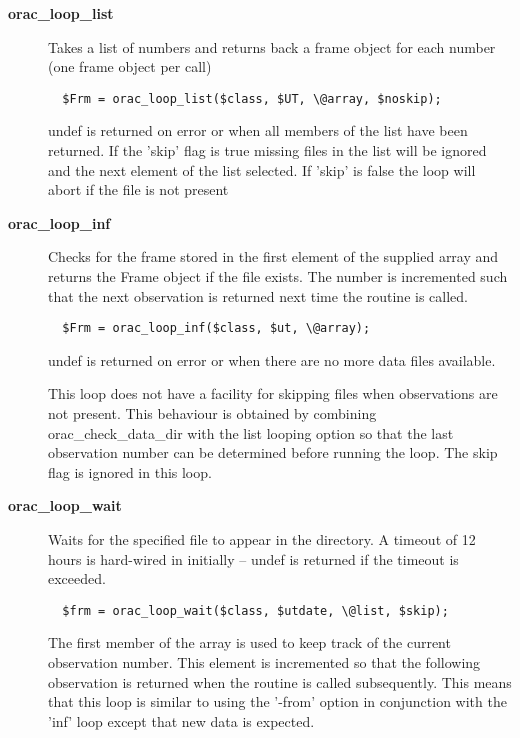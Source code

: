 \begin{description}

\item[{\textbf{orac\_loop\_list}}] \mbox{}

Takes a list of numbers and returns back a frame object
for each number (one frame object per call)

\begin{verbatim}
  $Frm = orac_loop_list($class, $UT, \@array, $noskip);
\end{verbatim}


undef is returned on error or when all members of the
list have been returned. If the 'skip' flag is true
missing files in the list will be ignored and the next
element of the list selected. If 'skip' is false
the loop will abort if the file is not present


\item[{\textbf{orac\_loop\_inf}}] \mbox{}

Checks for the frame stored in the first element of the supplied array
and returns the Frame object if the file exists. The number is incremented
such that the next observation is returned next time the routine is
called.

\begin{verbatim}
  $Frm = orac_loop_inf($class, $ut, \@array);
\end{verbatim}


undef is returned on error or when there are no more data files
available.



This loop does not have a facility for skipping files when observations
are not present. This behaviour is obtained by combining
orac\_check\_data\_dir with the list looping option so that the last
observation number can be determined before running the loop. The skip
flag is ignored in this loop.


\item[{\textbf{orac\_loop\_wait}}] \mbox{}

Waits for the specified file to appear in the directory.
A timeout of 12 hours is hard-wired in initially -- undef
is returned if the timeout is exceeded.

\begin{verbatim}
  $frm = orac_loop_wait($class, $utdate, \@list, $skip);
\end{verbatim}


The first member of the array is used to keep track of the
current observation number. This element is incremented so that
the following observation is returned when the routine is called
subsequently. This means that this loop is similar to using the
'-from' option in conjunction with the 'inf' loop except that
new data is expected.




\end{description}
